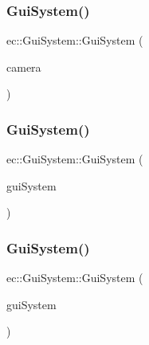 \subsubsection{\texorpdfstring{Gui\+System()}{GuiSystem()}\hspace{0.1cm}{\footnotesize\ttfamily [1/3]}}
{\footnotesize\ttfamily ec\+::\+Gui\+System\+::\+Gui\+System (\begin{DoxyParamCaption}\item[{\mbox{\hyperlink{classec_1_1_camera}{Camera}} $\ast$}]{camera }\end{DoxyParamCaption})\hspace{0.3cm}{\ttfamily [explicit]}}

\mbox{\label{classec_1_1_gui_system_a87ff5e071c04700db58206587ac22ef0}} 
\subsubsection{\texorpdfstring{Gui\+System()}{GuiSystem()}\hspace{0.1cm}{\footnotesize\ttfamily [2/3]}}
{\footnotesize\ttfamily ec\+::\+Gui\+System\+::\+Gui\+System (\begin{DoxyParamCaption}\item[{const \mbox{\hyperlink{classec_1_1_gui_system}{Gui\+System}} \&}]{gui\+System }\end{DoxyParamCaption})\hspace{0.3cm}{\ttfamily [delete]}}

\mbox{\label{classec_1_1_gui_system_a49db1331145566108321976e4ac95a62}} 
\subsubsection{\texorpdfstring{Gui\+System()}{GuiSystem()}\hspace{0.1cm}{\footnotesize\ttfamily [3/3]}}
{\footnotesize\ttfamily ec\+::\+Gui\+System\+::\+Gui\+System (\begin{DoxyParamCaption}\item[{\mbox{\hyperlink{classec_1_1_gui_system}{Gui\+System}} \&\&}]{gui\+System }\end{DoxyParamCaption})\hspace{0.3cm}{\ttfamily [default]}}

